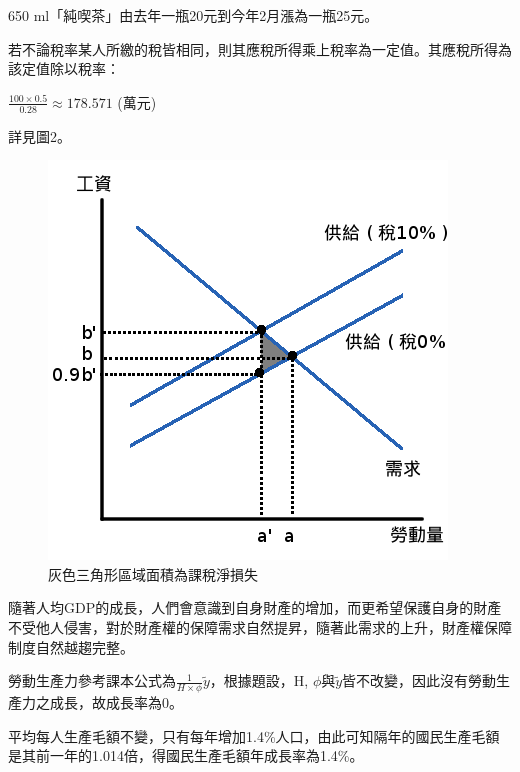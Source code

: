 \documentclass[12pt]{article}
\begin{document}
\begin{CJK}{UTF8}{cwmb}
\begin{num}
\begin{num}
 \end{num}

\item 650 ml「純喫茶」由去年一瓶20元到今年2月漲為一瓶25元。

\item 
  \begin{num}
   \item 若不論稅率某人所繳的稅皆相同，則其應稅所得乘上稅率為一定值。其應稅所得為該定值除以稅率：

$\frac{100\times0.5}{0.28} \approx 178.571$  (萬元) 

   \item 詳見圖2。
   \begin{figure}[htp]
\centering
\includegraphics[scale=0.50]{dlot.png}
\caption{灰色三角形區域面積為課稅淨損失}
\label{}
\end{figure}
  \end{num}
\item 隨著人均GDP的成長，人們會意識到自身財產的增加，而更希望保護自身的財產不受他人侵害，對於財產權的保障需求自然提昇，隨著此需求的上升，財產權保障制度自然越趨完整。
\item 
	\begin{num}
		\item 勞動生產力參考課本公式為$\frac{1}{H\times\phi}\tilde{y}$，根據題設，H, $\phi$與$\tilde{y}$皆不改變，因此沒有勞動生產力之成長，故成長率為0。
		\item 平均每人生產毛額不變，只有每年增加1.4\%人口，由此可知隔年的國民生產毛額是其前一年的1.014倍，得國民生產毛額年成長率為1.4\%。
	\end{num}
\end{num}

\end{CJK}
\end{document}
